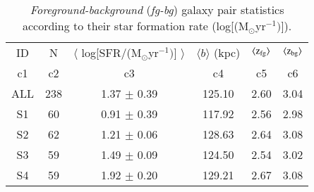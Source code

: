 \documentclass[longauth]{aa}
\begin{document}
\begin{appendix}
\begin{table}[h]
\centering
\caption{\label{tbl:PairsStat-SFR}
\textit{Foreground-background} (\textit{fg-bg}) galaxy pair statistics 
according to their star formation rate (log[(M$_{\odot}$yr$^{-1})]$).}
\begin{tabular}{cccccc}
  \\
  \hline\hline
  \multicolumn{1}{c}{ID} &
  \multicolumn{1}{c}{N} &
  \multicolumn{1}{c}{$\langle$ log[SFR/(M$_{\odot}$yr$^{-1})]$ $\rangle$ }&
  \multicolumn{1}{c}{$\langle b \rangle$ (kpc)} & 
  \multicolumn{1}{c}{$\langle \rm{z}_{\rm{fg}}\rangle$} &
  \multicolumn{1}{c}{$\langle \rm{z}_{\rm{bg}}\rangle$} \\
  \multicolumn{1}{c}{c1} & 
  \multicolumn{1}{c}{c2} &
  \multicolumn{1}{c}{c3} &
  \multicolumn{1}{c}{c4} &
  \multicolumn{1}{c}{c5} &
  \multicolumn{1}{c}{c6} \\
  \hline\hline  
ALL & 238 & 1.37 $\pm$  0.39 & 125.10 & 2.60 & 3.04 \\
S1  &  60 & 0.91 $\pm$  0.39 & 117.92 & 2.56 & 2.98 \\
S2  &  62 & 1.21 $\pm$  0.06 & 128.63 & 2.64 & 3.08 \\
S3  &  59 & 1.49 $\pm$  0.09 & 124.50 & 2.54 & 3.02 \\
S4  &  59 & 1.92 $\pm$  0.20 & 129.21 & 2.67 & 3.08 \\
  \hline\hline
\end{tabular}
\end{table}


\end{appendix}
\end{document}
